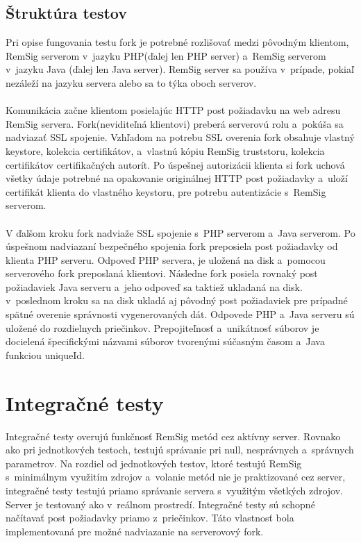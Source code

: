 \documentclass[
  digital, %
  table,   %
oneside,
  nolof,     %
  nolot,     %
]{fithesis3}
\begin{document}
\subsection{Štruktúra testov}
Pri opise fungovania testu fork je potrebné rozlišovať medzi pôvodným klientom, RemSig serverom v~jazyku PHP(ďalej len PHP server) a~RemSig serverom v~jazyku Java (ďalej len Java server). RemSig server sa používa v~prípade, pokiaľ nezáleží na jazyku servera alebo sa to týka oboch serverov. \paragraph{} 
Komunikácia začne klientom posielajúc HTTP post požiadavku na web adresu RemSig servera. Fork(neviditeľná klientovi) preberá serverovú rolu a~pokúša sa nadviazať SSL spojenie. Vzhľadom na potrebu SSL overenia fork  obsahuje vlastný keystore, kolekcia certifikátov, a~vlastnú kópiu RemSig truststoru, kolekcia certifikátov certifikačných autorít. Po úspešnej autorizácii klienta si fork uchová všetky údaje potrebné na opakovanie originálnej HTTP post požiadavky a~uloží certifikát klienta do vlastného keystoru, pre potrebu autentizácie s~RemSig serverom. \paragraph{}
V ďalšom kroku fork nadviaže SSL spojenie s~PHP serverom a~Java serverom. Po úspešnom nadviazaní bezpečného spojenia fork preposiela post požiadavky od klienta PHP serveru. Odpoveď PHP servera, je uložená na disk a~pomocou serverového fork preposlaná klientovi. Následne fork posiela rovnaký post požiadaviek Java serveru a~jeho odpoveď sa taktiež ukladaná na disk. v~poslednom kroku sa na disk ukladá aj pôvodný post požiadaviek pre prípadné spätné overenie správnosti vygenerovaných dát. Odpovede PHP a~Java serveru sú uložené do rozdielnych priečinkov. Prepojiteľnosť a~unikátnosť  súborov je docielená špecifickými názvami súborov tvorenými súčasným časom a~Java funkciou  uniqueId. 



\section{Integračné testy}
Integračné testy  overujú funkčnosť RemSig metód cez aktívny server. Rovnako ako pri jednotkových testoch, testujú správanie pri null, nesprávnych a~správnych parametrov. Na rozdiel od jednotkových testov, ktoré testujú RemSig s~minimálnym využitím zdrojov a~volanie metód nie je praktizované cez server, integračné testy testujú priamo správanie servera s~využitým všetkých zdrojov. Server je testovaný ako v~reálnom prostredí. Integračné testy sú schopné načítavať post požiadavky priamo z~priečinkov. Táto  vlastnosť bola implementovaná pre možné nadviazanie na  serverovový  fork.
\end{document}
